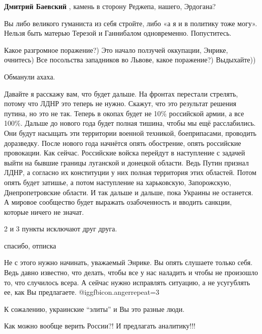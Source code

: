 \begin{itemize}
\textbf{Дмитрий Баевский} , камень в сторону Реджепа, нашего, Эрдогана?


Вы либо великого гуманиста из себя стройте, либо «а я и в политику тоже могу».
Нельзя быть матерью Терезой и Ганнибалом одновременно. Попуститесь.


Какое разгромное поражение?) Это начало ползучей оккупации, Энрике, очнитесь)
Все посольства западников во Львове, какое поражение?) Выдыхайте))

Обманули ахаха.


Давайте я расскажу вам, что будет дальше. На фронтах перестали стрелять, потому
что ЛДНР это теперь не нужно. Скажут, что это результат решения путина, но это
не так. Теперь в окопах будет не 10\% российской армии, а все 100\%. Дальше до
нового года будет полная тишина, чтобы мы ещё расслабились. Они будут насыщать
эти территории военной техникой, боеприпасами, проводить доразведку. После
нового года начнётся опять обострение, опять российские провокации. Как сейчас.
Российские войска перейдут в наступление с задачей выйти на бывшие границы
луганской и донецкой области. Ведь Путин признал ЛДНР, а согласно их
конституции у них полная территория этих областей. Потом опять будет затишье, а
потом наступление на харьковскую, Запорожскую, Днепропетровские области. И так
дальше и дальше, пока Украины не останется. А мировое сообщество будет выражать
озабоченность и вводить санкции, которые ничего не значат.


2 и 3 пункты исключают друг друга.

спасибо, отписка


Не с этого нужно начинать, уважаемый Энрике. Вы опять слушаете только себя.
Ведь давно известно, что делать, чтобы все у нас наладить и чтобы не произошло
то, что случилось всера. А сейчас нужно исправлять ситуацию, а не усугублять
ее, как Вы предлагаете.  @igg{fbicon.anger}{repeat=3} 

К сожалению, украинские \enquote{элиты} и Вы это разные люди.

Как можно вообще верить России?! И предлагать аналитику!!!

\end{itemize} %

